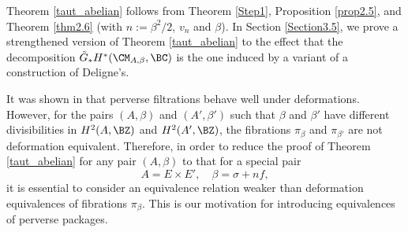 Theorem \ref{taut_abelian} follows from Theorem \ref{Step1}, Proposition \ref{prop2.5}, and Theorem \ref{thm2.6}
{(with $n:=\beta^2/2$, $v_n$ and $\beta$)}. In Section \ref{Section3.5}, we prove a strengthened version of Theorem \ref{taut_abelian} to the effect that  the decomposition $\tilde{G}_*H^*(\CM_{A,\beta}, \BC)$ is the one  induced by a variant of a construction of Deligne's.

\begin{rmk}
\notready\label{remark2.8}
It was shown in \cite{dCM} that perverse filtrations behave well under deformations. However, for the pairs $(A, \beta)$ and $(A',\beta')$ such that $\beta$ and $\beta'$ have different divisibilities in $H^2(A, \BZ)$ and $H^2(A',\BZ)$, the fibrations $\pi_\beta$ and $\pi_{\beta'}$ are not deformation equivalent.
Therefore,  in order to reduce the proof of Theorem \ref{taut_abelian} for any pair $(A,\beta)$ to that for a special pair
\[
A= E \times E', \quad \beta = \sigma +n f,
\]
it is essential to consider an equivalence relation weaker than deformation equivalences of fibrations $\pi_\beta$. This is our motivation for introducing  equivalences of perverse packages.
\end{rmk}
